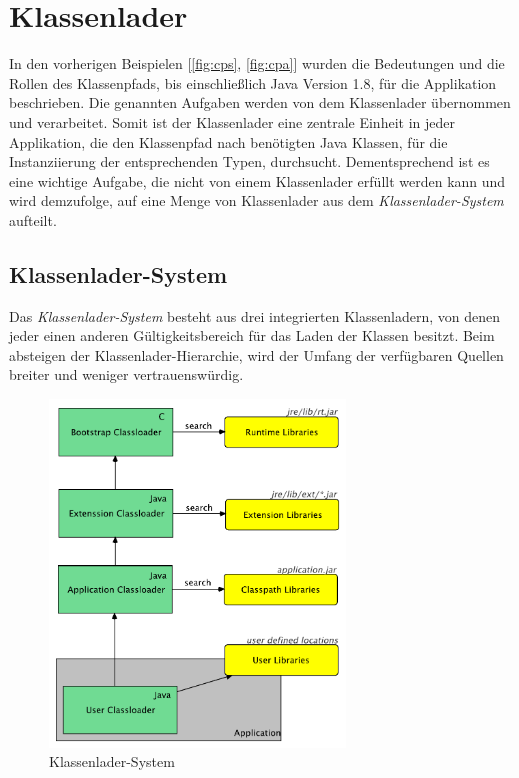 \section{Klassenlader}\label{sec:cl}

  In den vorherigen Beispielen [\ref{fig:cps}, \ref{fig:cpa}] wurden die Bedeutungen und die Rollen des Klassenpfads, bis einschließlich Java Version 1.8, für die Applikation beschrieben. Die genannten Aufgaben werden von dem Klassenlader übernommen und verarbeitet. Somit ist der Klassenlader eine zentrale Einheit in jeder Applikation, die den Klassenpfad nach benötigten Java Klassen, für die Instanziierung der entsprechenden Typen, durchsucht. Dementsprechend ist es eine wichtige Aufgabe, die nicht von einem Klassenlader erfüllt werden kann und wird demzufolge, auf eine Menge von Klassenlader aus dem \textit{Klassenlader-System} aufteilt. 


  \subsection{Klassenlader-System} \label{sec:cls}

    Das \textit{Klassenlader-System} besteht aus drei integrierten Klassenladern, von denen jeder einen anderen Gültigkeitsbereich für das Laden der Klassen besitzt. Beim absteigen der Klassenlader-Hierarchie, wird der Umfang der verfügbaren Quellen breiter und weniger vertrauenswürdig. 

    \begin{figure}[h!]
      \centering
      \includegraphics[width=0.7\textwidth]{material/images/Classloader-Hierarhie2.pdf}
      \caption{Klassenlader-System \cite{classLoadingIntro}}
      \label{fig:cl}
    \end{figure}
    
